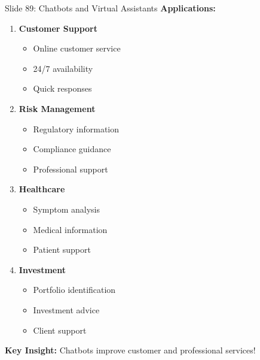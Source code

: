 \documentclass[8pt]{beamer}
\begin{document}
	\begin{frame}{Slide 89: Chatbots and Virtual Assistants}
		\fontsize{6.5}{7.5}\selectfont
		\textbf{Applications:}
		\begin{enumerate}
			\item \textbf{Customer Support}
			\begin{itemize}
				\item Online customer service
				\item 24/7 availability
				\item Quick responses
			\end{itemize}
			\item \textbf{Risk Management}
			\begin{itemize}
				\item Regulatory information
				\item Compliance guidance
				\item Professional support
			\end{itemize}
			\item \textbf{Healthcare}
			\begin{itemize}
				\item Symptom analysis
				\item Medical information
				\item Patient support
			\end{itemize}
			\item \textbf{Investment}
			\begin{itemize}
				\item Portfolio identification
				\item Investment advice
				\item Client support
			\end{itemize}
		\end{enumerate}
		
		\textcolor{myblue}{\textbf{Key Insight:}} Chatbots improve customer and professional services!
	\end{frame}
	
\end{document}
